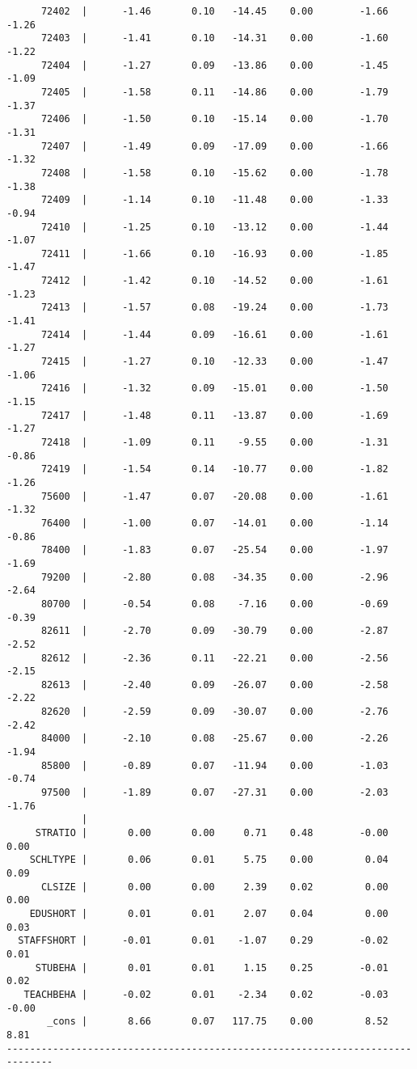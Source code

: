 \documentclass[10pt, letterpaper]{article}
\begin{document}
\begin{spacing}{1.4}
\begin{spacing}{.5}
\begin{scriptsize}
\begin{verbatim}
      72402  |      -1.46       0.10   -14.45    0.00        -1.66       -1.26
      72403  |      -1.41       0.10   -14.31    0.00        -1.60       -1.22
      72404  |      -1.27       0.09   -13.86    0.00        -1.45       -1.09
      72405  |      -1.58       0.11   -14.86    0.00        -1.79       -1.37
      72406  |      -1.50       0.10   -15.14    0.00        -1.70       -1.31
      72407  |      -1.49       0.09   -17.09    0.00        -1.66       -1.32
      72408  |      -1.58       0.10   -15.62    0.00        -1.78       -1.38
      72409  |      -1.14       0.10   -11.48    0.00        -1.33       -0.94
      72410  |      -1.25       0.10   -13.12    0.00        -1.44       -1.07
      72411  |      -1.66       0.10   -16.93    0.00        -1.85       -1.47
      72412  |      -1.42       0.10   -14.52    0.00        -1.61       -1.23
      72413  |      -1.57       0.08   -19.24    0.00        -1.73       -1.41
      72414  |      -1.44       0.09   -16.61    0.00        -1.61       -1.27
      72415  |      -1.27       0.10   -12.33    0.00        -1.47       -1.06
      72416  |      -1.32       0.09   -15.01    0.00        -1.50       -1.15
      72417  |      -1.48       0.11   -13.87    0.00        -1.69       -1.27
      72418  |      -1.09       0.11    -9.55    0.00        -1.31       -0.86
      72419  |      -1.54       0.14   -10.77    0.00        -1.82       -1.26
      75600  |      -1.47       0.07   -20.08    0.00        -1.61       -1.32
      76400  |      -1.00       0.07   -14.01    0.00        -1.14       -0.86
      78400  |      -1.83       0.07   -25.54    0.00        -1.97       -1.69
      79200  |      -2.80       0.08   -34.35    0.00        -2.96       -2.64
      80700  |      -0.54       0.08    -7.16    0.00        -0.69       -0.39
      82611  |      -2.70       0.09   -30.79    0.00        -2.87       -2.52
      82612  |      -2.36       0.11   -22.21    0.00        -2.56       -2.15
      82613  |      -2.40       0.09   -26.07    0.00        -2.58       -2.22
      82620  |      -2.59       0.09   -30.07    0.00        -2.76       -2.42
      84000  |      -2.10       0.08   -25.67    0.00        -2.26       -1.94
      85800  |      -0.89       0.07   -11.94    0.00        -1.03       -0.74
      97500  |      -1.89       0.07   -27.31    0.00        -2.03       -1.76
             |
     STRATIO |       0.00       0.00     0.71    0.48        -0.00        0.00
    SCHLTYPE |       0.06       0.01     5.75    0.00         0.04        0.09
      CLSIZE |       0.00       0.00     2.39    0.02         0.00        0.00
    EDUSHORT |       0.01       0.01     2.07    0.04         0.00        0.03
  STAFFSHORT |      -0.01       0.01    -1.07    0.29        -0.02        0.01
     STUBEHA |       0.01       0.01     1.15    0.25        -0.01        0.02
   TEACHBEHA |      -0.02       0.01    -2.34    0.02        -0.03       -0.00
       _cons |       8.66       0.07   117.75    0.00         8.52        8.81
------------------------------------------------------------------------------



\end{verbatim}
\end{scriptsize}
\end{spacing}
\end{spacing}
\end{document}
